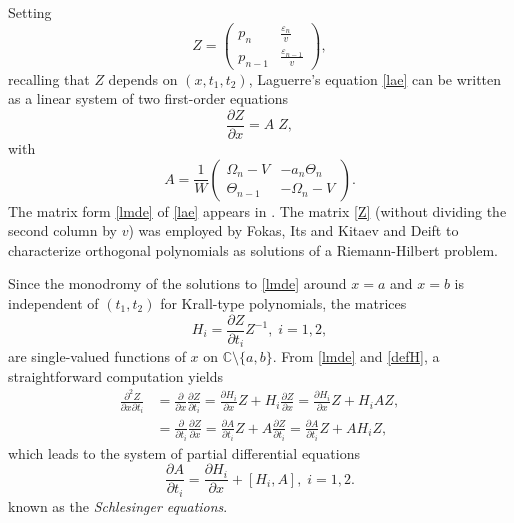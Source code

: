 \documentclass[10pt, reqno]{amsart}
\numberwithin{equation}{section}
\numberwithin{equation}{section}
\begin{document}
Setting
\begin{equation}
Z=\begin{pmatrix} p_n&\frac{\varepsilon_n}{v}\\p_{n-1}&\frac{\varepsilon_{n-1}}{v}\end{pmatrix}, \label{Z}
\end{equation}
recalling that $Z$ depends on $(x, t_1,t_2)$, Laguerre's equation \eqref{lae} can be written as a linear system of two first-order equations
\begin{equation}
\frac{\partial Z}{\partial x}= A\;Z, \label{lmde}
\end{equation}
with
\begin{equation}
A=\frac{1}{W}\begin{pmatrix} \Omega_n-V&-a_n\Theta_n\\\Theta_{n-1}&-\Omega_n-V\end{pmatrix}.\label{lm}
\end{equation}
The matrix form \eqref{lmde} of \eqref{lae} appears in \cite{M}. The matrix \eqref{Z} (without dividing the second column by $v$) was employed by Fokas, Its and Kitaev \cite{FIK} and Deift \cite{De} to characterize orthogonal polynomials as solutions of a Riemann-Hilbert problem.

Since the monodromy of the solutions to \eqref{lmde} around $x=a$ and $x=b$ is independent of $(t_1, t_2)$ for Krall-type polynomials, the matrices
\begin{equation}
H_i=\frac{\partial Z}{\partial t_i} Z^{-1},\; i=1, 2,\label{defH}
\end{equation}
are single-valued functions of $x$ on $\mathbb{C}\setminus \{a,b\}$. From \eqref{lmde} and \eqref{defH}, a straightforward computation yields  
\begin{align*}
\frac{\partial^2 Z}{\partial x \partial t_i}&= \frac{\partial}{\partial x} \frac{\partial Z}{\partial t_i}=\frac{\partial H_i}{\partial x}Z+H_i\frac{\partial Z}{\partial x}=\frac{\partial H_i}{\partial x}Z+H_iAZ,\\
&=\frac{\partial}{\partial t_i}\frac{\partial Z}{\partial x}=\frac{\partial A}{\partial t_i}Z+A\frac{\partial Z}{\partial t_i}=\frac{\partial A}{\partial t_i}Z+AH_iZ,
\end{align*}
which leads to the system of partial differential equations
\begin{equation}
\frac{\partial A}{\partial t_i}=\frac{\partial H_i}{\partial x}+[H_i,A],\; i=1, 2.\label{PSL}
\end{equation}
known as the \emph{Schlesinger equations}.
\end{document}

